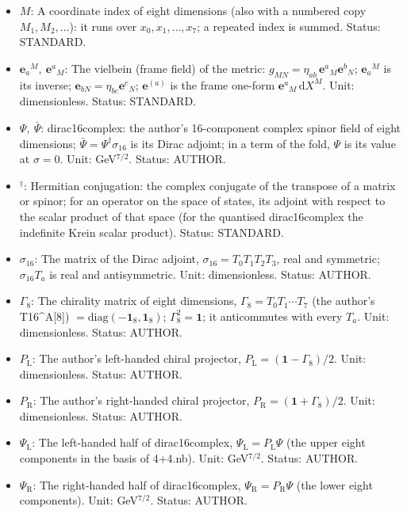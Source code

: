 \documentclass[
  10pt,
]{article}
\begin{document}
\begin{itemize}
  along the time). Unit: dimensionless. Status: AUTHOR.
\item
  \(M\): A coordinate index of eight dimensions (also with a numbered
  copy \(M_1, M_2, \dots\)): it runs over \(x_0, x_1, \dots, x_7\); a
  repeated index is summed. Status: STANDARD.
\item
  \(\mathbf{e}_a{}^M,\ \mathbf{e}^a{}_M\): The vielbein (frame field) of
  the metric: \(g_{MN} = \eta_{ab}\,\mathbf{e}^a{}_M\mathbf{e}^b{}_N\);
  \(\mathbf{e}_a{}^M\) is its inverse;
  \(\mathbf{e}_{bN} = \eta_{bc}\mathbf{e}^c{}_N\); \(\mathbf{e}^{(a)}\)
  is the frame one-form \(\mathbf{e}^a{}_M\,\mathrm{d}X^M\). Unit:
  dimensionless. Status: STANDARD.
\item
  \(\Psi,\ \bar\Psi\): dirac16complex: the author's 16-component complex
  spinor field of eight dimensions;
  \(\bar\Psi = \Psi^\dagger\sigma_{16}\) is its Dirac adjoint; in a term
  of the fold, \(\Psi\) is its value at \(\sigma = 0\). Unit:
  GeV\(^{7/2}\). Status: AUTHOR.
\item
  \({}^\dagger\): Hermitian conjugation: the complex conjugate of the
  transpose of a matrix or spinor; for an operator on the space of
  states, its adjoint with respect to the scalar product of that space
  (for the quantised dirac16complex the indefinite Krein scalar
  product). Status: STANDARD.
\item
  \(\sigma_{16}\): The matrix of the Dirac adjoint,
  \(\sigma_{16} = T_0T_1T_2T_3\), real and symmetric; \(\sigma_{16}T_a\)
  is real and antisymmetric. Unit: dimensionless. Status: AUTHOR.
\item
  \(\Gamma_8\): The chirality matrix of eight dimensions,
  \(\Gamma_8 = T_0T_1\cdots T_7\) (the author's T16\^{}A{[}8{]})
  \(= \mathrm{diag}(-\mathbf{1}_8, \mathbf{1}_8)\);
  \(\Gamma_8^2 = \mathbf{1}\); it anticommutes with every \(T_a\). Unit:
  dimensionless. Status: AUTHOR.
\item
  \(P_{\mathrm{L}}\): The author's left-handed chiral projector,
  \(P_{\mathrm{L}} = (\mathbf{1} - \Gamma_8)/2\). Unit: dimensionless.
  Status: AUTHOR.
\item
  \(P_{\mathrm{R}}\): The author's right-handed chiral projector,
  \(P_{\mathrm{R}} = (\mathbf{1} + \Gamma_8)/2\). Unit: dimensionless.
  Status: AUTHOR.
\item
  \(\Psi_{\mathrm{L}}\): The left-handed half of dirac16complex,
  \(\Psi_{\mathrm{L}} = P_{\mathrm{L}}\Psi\) (the upper eight components
  in the basis of 4+4.nb). Unit: GeV\(^{7/2}\). Status: AUTHOR.
\item
  \(\Psi_{\mathrm{R}}\): The right-handed half of dirac16complex,
  \(\Psi_{\mathrm{R}} = P_{\mathrm{R}}\Psi\) (the lower eight
  components). Unit: GeV\(^{7/2}\). Status: AUTHOR.
\end{itemize}
\end{document}
